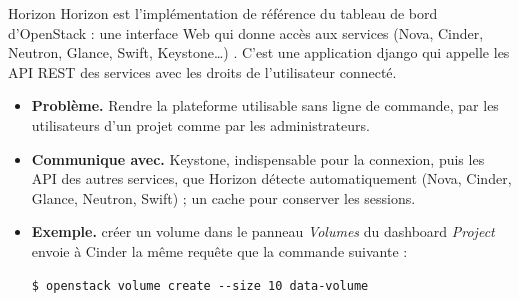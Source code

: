 \begin{definition}{Horizon}
Horizon est l'implémentation de référence du tableau de bord d'OpenStack : une interface Web qui donne accès aux
services (Nova, Cinder, Neutron, Glance, Swift, Keystone\dots) \parencite{horizon-docs}. C'est une application
\gls{django} qui appelle les API REST des services avec les droits de l'utilisateur connecté.
\end{definition}

\begin{itemize}
  \item \textbf{Problème.} Rendre la plateforme utilisable sans ligne de commande, par les utilisateurs d'un projet comme par
        les administrateurs.
  \item \textbf{Communique avec.} Keystone, indispensable pour la connexion, puis les API des autres services, que
        Horizon détecte automatiquement (Nova, Cinder, Glance, Neutron, Swift) \parencite{horizon-requirements} ; un cache
        pour conserver les sessions.
  \item \textbf{Exemple.} créer un volume dans le panneau \emph{Volumes} du dashboard \emph{Project} envoie à Cinder la
        même requête que la commande suivante :
\begin{lstlisting}[style=terminal]
$ openstack volume create --size 10 data-volume
\end{lstlisting}
\end{itemize}

